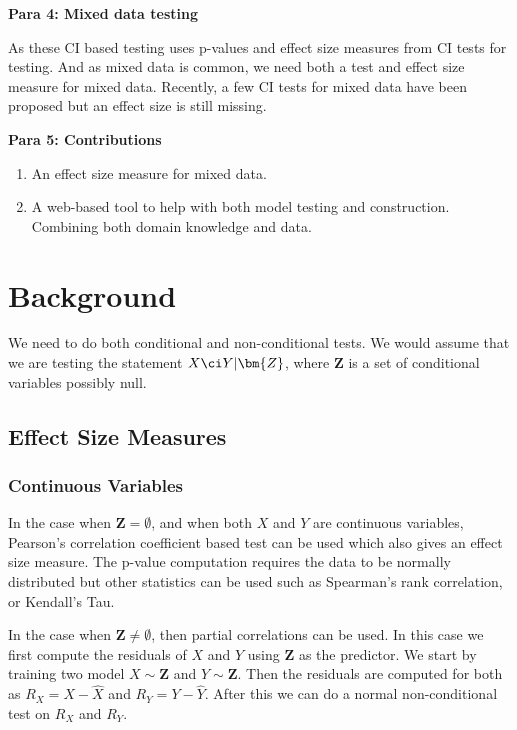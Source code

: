 \documentclass{article}
\begin{document}
\textbf{Para 4: Mixed data testing}

As these CI based testing uses p-values and effect size measures from CI tests
for testing. And as mixed data is common, we need both a test and effect size
measure for mixed data. Recently, a few CI tests for mixed data have been
proposed but an effect size is still missing.


\textbf{Para 5: Contributions}
\begin{enumerate}
	\item An effect size measure for mixed data. 
	\item A web-based tool to help with both model testing and construction. Combining both domain knowledge and data.
\end{enumerate}

\section{Background}

We need to do both conditional and non-conditional tests. We would assume that
we are testing the statement $ X \ci Y \rvert \bm{Z} $, where $ \bm{Z} $ is a
set of conditional variables possibly null.

\subsection{Effect Size Measures}

\subsubsection{Continuous Variables}
In the case when $ \bm{Z} = \emptyset $, and when both $ X $ and $ Y $ are
continuous variables, Pearson's correlation coefficient based test can be used
which also gives an effect size measure. The p-value computation requires the
data to be normally distributed but other statistics can be used such as
Spearman's rank correlation, or Kendall's Tau.

In the case when $ \bm{Z} \neq \emptyset $, then partial correlations can be used.
In this case we first compute the residuals of $ X $ and $ Y $ using $ \bm{Z} $ as 
the predictor. We start by training two model $ X \sim \bm{Z} $ and $ Y \sim \bm{Z} $.
Then the residuals are computed for both as $ R_X = X - \hat{X} $ and $ R_Y = Y - \hat{Y} $.
After this we can do a normal non-conditional test on $ R_X $ and $ R_Y $.
\end{document}
